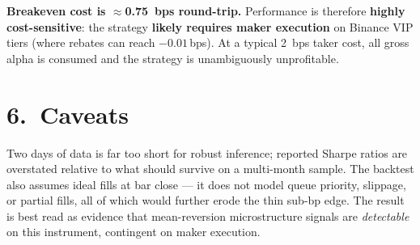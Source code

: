 \documentclass[10pt,a4paper]{article}
\begin{document}
\smallskip
\textbf{Breakeven cost is $\approx$0.75~bps round-trip.} Performance is therefore
\textbf{highly cost-sensitive}: the strategy \textbf{likely requires maker execution}
on Binance VIP tiers (where rebates can reach $-0.01$\,bps).
At a typical 2~bps taker cost, all gross alpha is consumed and the strategy is
unambiguously unprofitable.

\section*{6.\ Caveats}
Two days of data is far too short for robust inference; reported Sharpe ratios are
overstated relative to what should survive on a multi-month sample. The backtest
also assumes ideal fills at bar close --- it does not model queue priority,
slippage, or partial fills, all of which would further erode the thin
sub-bp edge. The result is best read as evidence that mean-reversion microstructure
signals are \emph{detectable} on this instrument, contingent on maker execution.
\end{document}
